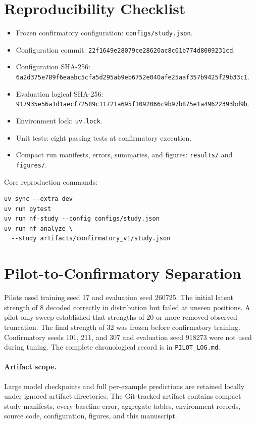 \documentclass[11pt]{article}
\begin{document}
\appendix

\section{Reproducibility Checklist}

\begin{itemize}
    \item Frozen confirmatory configuration:
    \texttt{configs/study.json}.
    \item Configuration commit:
    \texttt{22f1649e28079ce28620ac8c01b774d8009231cd}.
    \item Configuration SHA-256:
    {\scriptsize\texttt{6a2d375e789f6eaabc5cfa5d295ab9eb6752e040afe25aaf357b9425f29b33c1}}.
    \item Evaluation logical SHA-256:
    {\scriptsize\texttt{917935e56a1d1aecf72589c11721a695f1092066c9b97b875e1a49622393bd9b}}.
    \item Environment lock: \texttt{uv.lock}.
    \item Unit tests: eight passing tests at confirmatory execution.
    \item Compact run manifests, errors, summaries, and figures:
    \texttt{results/} and \texttt{figures/}.
\end{itemize}

Core reproduction commands:

\begin{verbatim}
uv sync --extra dev
uv run pytest
uv run nf-study --config configs/study.json
uv run nf-analyze \
  --study artifacts/confirmatory_v1/study.json
\end{verbatim}

\section{Pilot-to-Confirmatory Separation}

Pilots used training seed 17 and evaluation seed 260725. The initial latent
strength of 8 decoded correctly in distribution but failed at unseen
positions. A pilot-only sweep established that strengths of 20 or more removed
observed truncation. The final strength of 32 was frozen before confirmatory
training. Confirmatory seeds 101, 211, and 307 and evaluation seed 918273 were
not used during tuning. The complete chronological record is in
\texttt{PILOT\_LOG.md}.

\paragraph{Artifact scope.}
Large model checkpoints and full per-example predictions are retained locally
under ignored artifact directories. The Git-tracked artifact contains compact
study manifests, every baseline error, aggregate tables, environment records,
source code, configuration, figures, and this manuscript.
\end{document}
